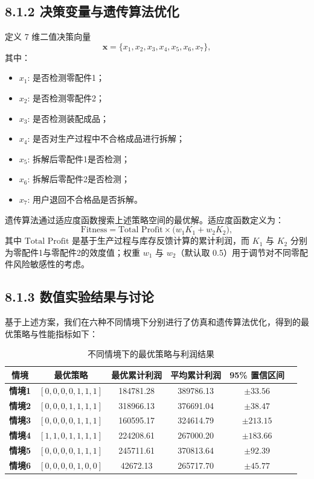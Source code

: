\documentclass{article}
\begin{document}
	\subsection*{8.1.2 决策变量与遗传算法优化}  
	定义 7 维二值决策向量
	\[
	\mathbf{x} = \{x_1,x_2,x_3,x_4,x_5,x_6,x_7\},
	\]
	其中：
	\begin{itemize}
		\item $x_1$: 是否检测零配件1；
		\item $x_2$: 是否检测零配件2；
		\item $x_3$: 是否检测装配成品；
		\item $x_4$: 是否对生产过程中不合格成品进行拆解；
		\item $x_5$: 拆解后零配件1是否检测；
		\item $x_6$: 拆解后零配件2是否检测；
		\item $x_7$: 用户退回不合格品是否拆解。
	\end{itemize}
	遗传算法通过适应度函数搜索上述策略空间的最优解。适应度函数定义为：
	\[
	\text{Fitness} = \text{Total Profit} \times \bigl( w_1 K_1 + w_2 K_2 \bigr),
	\]
	其中 $\text{Total Profit}$ 是基于生产过程与库存反馈计算的累计利润，而 $K_1$ 与 $K_2$ 分别为零配件1与零配件2的效度值；权重 $w_1$ 与 $w_2$（默认取 0.5）用于调节对不同零配件风险敏感性的考虑。
	
	\subsection*{8.1.3 数值实验结果与讨论}  
	基于上述方案，我们在六种不同情境下分别进行了仿真和遗传算法优化，得到的最优策略与性能指标如下：
	\begin{table}[ht]
		\centering
		\begin{tabular}{@{}cccccc@{}}
			\toprule
			\textbf{情境} & \textbf{最优策略} & \textbf{最优累计利润} & \textbf{平均累计利润} & \textbf{95\% 置信区间} \\ \midrule
			\textbf{情境1} & $[0,0,0,0,1,1,1]$ & 184781.28 & 389786.13 & $\pm33.56$ \\
			\textbf{情境2} & $[0,0,0,1,1,1,1]$ & 318966.13 & 376691.04 & $\pm38.47$ \\
			\textbf{情境3} & $[0,0,0,0,1,1,1]$ & 160595.17 & 324614.79 & $\pm213.15$ \\
			\textbf{情境4} & $[1,1,0,1,1,1,1]$ & 224208.61 & 267000.20 & $\pm183.66$ \\
			\textbf{情境5} & $[0,0,0,0,1,1,1]$ & 245711.61 & 370813.64 & $\pm92.39$ \\
			\textbf{情境6} & $[0,0,0,0,1,0,0]$ & 42672.13  & 265717.70 & $\pm45.77$ \\ \bottomrule
		\end{tabular}
		\caption{不同情境下的最优策略与利润结果}
	\end{table}
	
\end{document}
